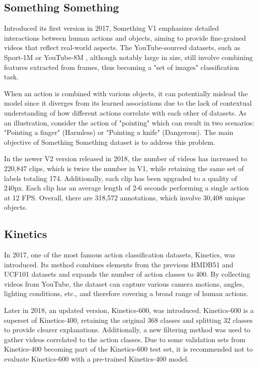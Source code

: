 \documentclass[a4paper]{article}
\begin{document}
\subsection{Something Something}
Introduced its first version in 2017, Something V1 \cite{somethingsomething} emphasizes detailed interactions between human actions and objects, aiming to provide fine-grained videos that reflect real-world aspects. The YouTube-sourced datasets, such as Sport-1M \cite{Sports1M} or YouTube-8M \cite{YouTube8M}, although notably large in size, still involve combining features extracted from frames, thus becoming a "set of images" classification task.

When an action is combined with various objects, it can potentially mislead the model since it diverges from its learned associations due to the lack of contextual understanding of how different actions correlate with each other of datasets. As an illustration, consider the action of "pointing" which can result in two scenarios: "Pointing a finger" (Harmless) or "Pointing a knife" (Dangerous). The main objective of Something Something dataset is to address this problem.

In the newer V2 version released in 2018, the number of videos has increased to 220,847 clips, which is twice the number in V1, while retaining the same set of labels totaling 174. Additionally, each clip has been upgraded to a quality of 240px. Each clip has an average length of 2-6 seconds performing a single action at 12 FPS. Overall, there are 318,572 annotations, which involve 30,408 unique objects. 
\subsection{Kinetics}
In 2017, one of the most famous action classification datasets, Kinetics, was introduced. Its method combines elements from the previous HMDB51 \cite{HMDB51} and UCF101 \cite{UCF101}datasets and expands the number of action classes to 400. By collecting videos from YouTube, the dataset can capture various camera motions, angles, lighting conditions, etc., and therefore covering a broad range of human actions.

Later in 2018, an updated version, Kinetics-600, was introduced. Kinetics-600 is a superset of Kinetics-400, retaining the original 368 classes and splitting 32 classes to provide clearer explanations. Additionally, a new filtering method was used to gather videos correlated to the action classes. Due to some validation sets from Kinetics-400 becoming part of the Kinetics-600 test set, it is recommended not to evaluate Kinetics-600 with a pre-trained Kinetics-400 model.
\end{document}
